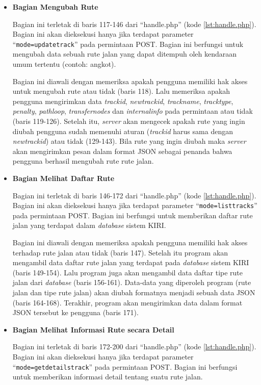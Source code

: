 \documentclass[a4paper,twoside]{article}
\begin{document}
\begin{enumerate}
\begin{itemize}
\item \textbf{Bagian Mengubah Rute}

Bagian ini terletak di baris 117-146 dari ``handle.php'' (kode \ref{lst:handle.php}). Bagian ini akan dieksekusi hanya jika terdapat parameter ``\texttt{mode=updatetrack}'' pada permintaan POST. Bagian ini berfungsi untuk mengubah data sebuah rute jalan yang dapat ditempuh oleh kendaraan umum tertentu (contoh: angkot).

Bagian ini diawali dengan memeriksa apakah pengguna memiliki hak akses untuk mengubah rute atau tidak (baris 118). Lalu memeriksa apakah pengguna mengirimkan data \textit{trackid}, \textit{newtrackid}, \textit{trackname}, \textit{tracktype}, \textit{penalty}, \textit{pathloop}, \textit{transfernodes}  dan \textit{internalinfo} pada permintaan atau tidak (baris 119-126). Setelah itu, \textit{server} akan mengecek apakah rute yang ingin diubah pengguna sudah memenuhi aturan (\textit{trackid} harus sama dengan \textit{newtrackid}) atau tidak (129-143). Bila rute yang ingin diubah maka \textit{server} akan mengirimkan pesan dalam format JSON sebagai penanda bahwa pengguna berhasil mengubah rute rute jalan.

\item \textbf{Bagian Melihat Daftar Rute}

Bagian ini terletak di baris 146-172 dari ``handle.php'' (kode \ref{lst:handle.php}). Bagian ini akan dieksekusi hanya jika terdapat parameter ``\texttt{mode=listtracks}'' pada permintaan POST. Bagian ini berfungsi untuk memberikan daftar rute jalan yang terdapat dalam \textit{database} sistem KIRI.

Bagian ini diawali dengan memeriksa apakah pengguna memiliki hak akses terhadap rute jalan atau tidak (baris 147). Setelah itu program akan mengambil data daftar rute jalan yang terdapat pada \textit{database} sistem KIRI (baris 149-154). Lalu program juga akan mengambil data daftar tipe rute jalan dari \textit{database} (baris 156-161). Data-data yang diperoleh program (rute jalan dan tipe rute jalan) akan diubah formatnya menjadi sebuah data JSON (baris 164-168). Terakhir, program akan mengirimkan data dalam format JSON tersebut ke pengguna (baris 171).

\item \textbf{Bagian Melihat Informasi Rute secara Detail}

Bagian ini terletak di baris 172-200 dari ``handle.php'' (kode \ref{lst:handle.php}). Bagian ini akan dieksekusi hanya jika terdapat parameter ``\texttt{mode=getdetailstrack}'' pada permintaan POST. Bagian ini berfungsi untuk memberikan informasi detail tentang suatu rute jalan.


\end{itemize}
\end{enumerate}
\end{document}
